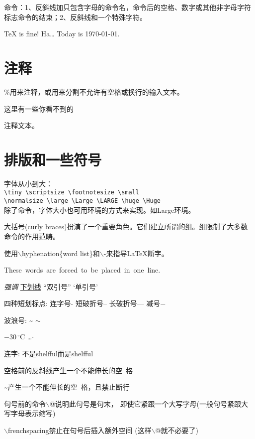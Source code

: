 \documentclass[12pt, a4paper, onecolumn, notitlepage]{article}
\begin{document}
命令：1、反斜线加只包含字母的命令名，命令后的空格、数字或其他非字母字符标志命令的结束；2、反斜线和一个特殊字符。

\TeX{} is fine! Ha\ldots{} Today is \today.
\section{注释}
\%用来注释，或用来分割不允许有空格或换行的输入文本。

这里有一些你看不到的%
\begin{comment}
这里用了verbatim宏包提供的comment环境。
注意，这方法不能使用在诸如数学环境等一些复杂环境中。
\end{comment}
注释文本。
\section{排版和一些符号}
字体从小到大：\\
\verb-\tiny \scriptsize \footnotesize \small-\\
\verb-\normalsize \large \Large \LARGE \huge \Huge-\\

除了命令，字体大小也可用环境的方式来实现。如Large环境。

大括号(curly braces)扮演了一个重要角色。它们建立所谓的组。组限制了大多数命令的作用范畴。

使用$\backslash$hyphenation\{word list\}和$\backslash$-来指导\LaTeX{}断字。

\mbox{These words are forced to be placed in one line.}


\emph{强调} \underline{下划线}
``双引号'' `单引号'

四种短划标点: 连字号- 短破折号-- 长破折号--- 减号$-$

波浪号: \~{} $\sim$

$-30\,^{\circ}\mathrm{C}$%
\quad \ldots \quad $\cdot$

连字: 不是shelfful而是shelf\mbox{}ful

空格前的反斜线产生一个不能伸长的空\ 格

\~{}产生一个不能伸长的空~格，且禁止断行

句号前的命令$\backslash$@说明此句号是句末，
即使它紧跟一个大写字母(一般句号紧跟大写字母表示缩写)

$\backslash$frenchspacing禁止在句号后插入额外空间
(这样$\backslash$@就不必要了)\\ \text{}
\end{document}
